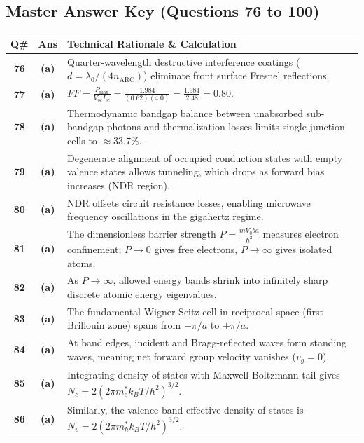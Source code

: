 \newpage

\subsection*{Master Answer Key (Questions 76 to 100)}

{\small
\noindent\begin{tabularx}{\textwidth}{|c|c|X|}
\hline
\textbf{Q\#} & \textbf{Ans} & \textbf{Technical Rationale \& Calculation} \\
\hline
\textbf{76} & \textbf{(a)} & Quarter-wavelength destructive interference coatings ($d = \lambda_0 / (4n_{\text{ARC}})$) eliminate front surface Fresnel reflections. \\ \hline
\textbf{77} & \textbf{(a)} & $FF = \frac{P_{\text{max}}}{V_{oc} I_{sc}} = \frac{1.984}{(0.62)(4.0)} = \frac{1.984}{2.48} = 0.80$. \\ \hline
\textbf{78} & \textbf{(a)} & Thermodynamic bandgap balance between unabsorbed sub-bandgap photons and thermalization losses limits single-junction cells to $\approx 33.7\%$. \\ \hline
\textbf{79} & \textbf{(a)} & Degenerate alignment of occupied conduction states with empty valence states allows tunneling, which drops as forward bias increases (NDR region). \\ \hline
\textbf{80} & \textbf{(a)} & NDR offsets circuit resistance losses, enabling microwave frequency oscillations in the gigahertz regime. \\ \hline
\textbf{81} & \textbf{(a)} & The dimensionless barrier strength $P = \frac{m V_0 b a}{\hbar^2}$ measures electron confinement; $P \to 0$ gives free electrons, $P \to \infty$ gives isolated atoms. \\ \hline
\textbf{82} & \textbf{(a)} & As $P \to \infty$, allowed energy bands shrink into infinitely sharp discrete atomic energy eigenvalues. \\ \hline
\textbf{83} & \textbf{(a)} & The fundamental Wigner-Seitz cell in reciprocal space (first Brillouin zone) spans from $-\pi/a$ to $+\pi/a$. \\ \hline
\textbf{84} & \textbf{(a)} & At band edges, incident and Bragg-reflected waves form standing waves, meaning net forward group velocity vanishes ($v_g = 0$). \\ \hline
\textbf{85} & \textbf{(a)} & Integrating density of states with Maxwell-Boltzmann tail gives $N_c = 2(2\pi m_e^* k_BT / h^2)^{3/2}$. \\ \hline
\textbf{86} & \textbf{(a)} & Similarly, the valence band effective density of states is $N_v = 2(2\pi m_h^* k_BT / h^2)^{3/2}$. \\ \hline

\end{tabularx}}
